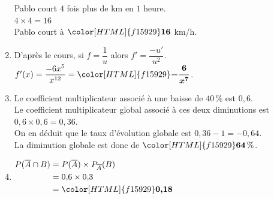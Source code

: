 \documentclass[a4paper,11pt,landscape,exos]{nsi} %
\begin{document}
\begin{multicols}{2}
\begin{enumerate}[]
    Pablo court $4$ fois plus de km en $1$ heure.\\
   $4\times 4=16$\\
   Pablo court à ${\color[HTML]{f15929}\boldsymbol{16}}$ km/h.
\item D'après le cours, si $f=\dfrac{1}{u}$ alors $f'=\dfrac{-u'}{u^2}$.\\
    $f'(x)=\dfrac{-6x^{5}}{x^{12}}={\color[HTML]{f15929}\boldsymbol{-\dfrac{6}{x^{7}}}}$.
\item  Le coefficient multiplicateur  associé à une baisse de $40\,\%$ est $0{,}6$.\\
    Le coefficient multiplicateur global associé à ces deux diminutions est $0{,}6\times 0{,}6= 0{,}36$.\\
    On en déduit que le taux d'évolution globale est $0{,}36-1=-0{,}64$.\\
    La diminution globale est donc de ${\color[HTML]{f15929}\boldsymbol{64}} \,\%$.
\item 
              $\begin{aligned}
                P(\overline{A}\cap B)&=P(\overline{A}) \times P_{\overline{A}}(B)\\
              &=0{,}6\times 0{,}3\\
              &={\color[HTML]{f15929}\boldsymbol{0{,}18}}
              \end{aligned}$              
\end{enumerate}
\end{multicols}
\end{document}

